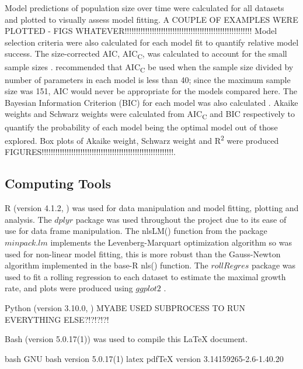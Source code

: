\documentclass[11pt]{article}
\begin{document}
\begin{linenumbers}
            Model predictions of population size over time were calculated for all datasets and plotted to visually assess model fitting. A COUPLE OF EXAMPLES WERE PLOTTED - FIGS WHATEVER!!!!!!!!!!!!!!!!!!!!!!!!!!!!!!!!!!!!!!!!!!!!!!!!!!!!!!!! Model selection criteria were also calculated for each model fit to quantify relative model success. The size-corrected AIC, AIC\textsubscript{C}, was calculated to account for the small sample sizes \citep{yang_4_2019}. \citet[p.~445]{burnham_model_2002} recommended that AIC\textsubscript{C} be used when the sample size divided by number of parameters in each model is less than 40; since the maximum sample size was 151, AIC would never be appropriate for the models compared here. The Bayesian Information Criterion (BIC) for each model was also calculated \citep{johnson_model_2004}. Akaike weights and Schwarz weights were calculated from AIC\textsubscript{C} and BIC respectively \citep{wagenmakers_aic_2004} to quantify the probability of each model being the optimal model out of those explored. Box plots of Akaike weight, Schwarz weight and R\textsuperscript{2} were produced FIGURES!!!!!!!!!!!!!!!!!!!!!!!!!!!!!!!!!!!!!!!!!!!!!!!!!!!!!!!!!!.
            

        \subsection{Computing Tools}
        
            R (version 4.1.2, \citet{R_language_2021}) was used for data manipulation and model fitting, plotting and analysis. The $dplyr$ package \citep{dplyr_2021} was used throughout the project due to its ease of use for data frame manipulation. The nlsLM() function from the package $minpack.lm$ \citep{minpack_2016} implements the Levenberg-Marquart optimization algorithm so was used for non-linear model fitting, this is more robust than the Gauss-Newton algorithm implemented in the base-R nls() function. The $rollRegres$ package \citep{roll_Regres_2019} was used to fit a rolling regression to each dataset to estimate the maximal growth rate, and plots were produced using $ggplot2$ \citep{ggplot_2016}. 
            
            Python (version 3.10.0, \citet{python_2009}) MYABE USED SUBPROCESS TO RUN EVERYTHING ELSE?!?!?!?!
            
            Bash (version 5.0.17(1)) was used to compile this LaTeX document.
            
            bash GNU bash version 5.0.17(1)
            latex pdfTeX version 3.14159265-2.6-1.40.20
        

\end{linenumbers}
\end{document}
